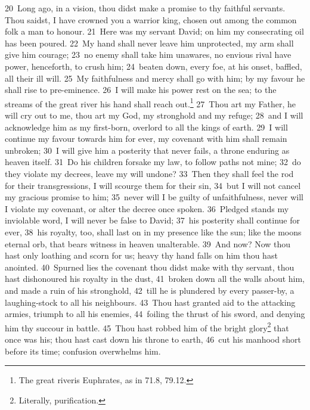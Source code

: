 \documentclass[10pt]{book} %
\begin{document}
\textcolor{benred8}{20}~Long ago, in a vision, thou didst make a promise to thy faithful servants. Thou saidst, I have crowned you a warrior king, chosen out among the common folk a man to honour. \textcolor{benred8}{21}~Here was my servant David; on him my consecrating oil has been poured. \textcolor{benred8}{22}~My hand shall never leave him unprotected, my arm shall give him courage; \textcolor{benred8}{23}~no enemy shall take him unawares, no envious rival have power, henceforth, to crush him; \textcolor{benred8}{24}~beaten down, every foe, at his onset, baffled, all their ill will. \textcolor{benred8}{25}~My faithfulness and mercy shall go with him; by my favour he shall rise to pre-eminence. \textcolor{benred8}{26}~I will make his power rest on the sea; to the streams of the great river his hand shall reach out.\footnote[2]{\textasciigrave The great river\textquotesingle  is Euphrates, as in 71.8, 79.12.} \textcolor{benred8}{27}~Thou art my Father, he will cry out to me, thou art my God, my stronghold and my refuge; \textcolor{benred8}{28}~and I will acknowledge him as my first-born, overlord to all the kings of earth. \textcolor{benred8}{29}~I will continue my favour towards him for ever, my covenant with him shall remain unbroken; \textcolor{benred8}{30}~I will give him a posterity that never fails, a throne enduring as heaven itself. \textcolor{benred8}{31}~Do his children forsake my law, to follow paths not mine; \textcolor{benred8}{32}~do they violate my decrees, leave my will undone? \textcolor{benred8}{33}~Then they shall feel the rod for their transgressions, I will scourge them for their sin, \textcolor{benred8}{34}~but I will not cancel my gracious promise to him; \textcolor{benred8}{35}~never will I be guilty of unfaithfulness, never will I violate my covenant, or alter the decree once spoken. \textcolor{benred8}{36}~Pledged stands my inviolable word, I will never be false to David; \textcolor{benred8}{37}~his posterity shall continue for ever, \textcolor{benred8}{38}~his royalty, too, shall last on in my presence like the sun; like the moon\textquotesingle s eternal orb, that bears witness in heaven unalterable.
\textcolor{benred8}{39}~And now? Now thou hast only loathing and scorn for us; heavy thy hand falls on him thou hast anointed. \textcolor{benred8}{40}~Spurned lies the covenant thou didst make with thy servant, thou hast dishonoured his royalty in the dust, \textcolor{benred8}{41}~broken down all the walls about him, and made a ruin of his stronghold, \textcolor{benred8}{42}~till he is plundered by every passer-by, a laughing-stock to all his neighbours. \textcolor{benred8}{43}~Thou hast granted aid to the attacking armies, triumph to all his enemies, \textcolor{benred8}{44}~foiling the thrust of his sword, and denying him thy succour in battle. \textcolor{benred8}{45}~Thou hast robbed him of the bright glory\footnote[3]{Literally, \textasciigrave purification\textquotesingle .} that once was his; thou hast cast down his throne to earth, \textcolor{benred8}{46}~cut his manhood short before its time; confusion overwhelms him.
\end{document}
